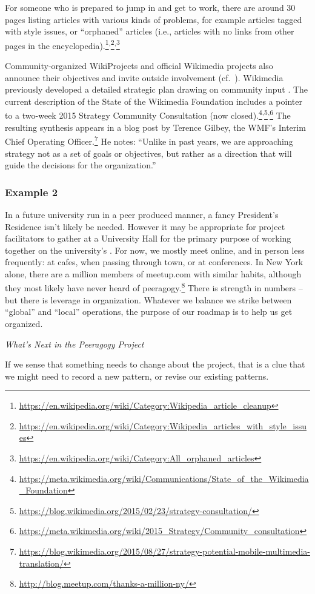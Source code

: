 For someone who is prepared to jump in and get to work, there are
around 30 pages listing articles with various kinds of problems, for
example articles tagged with style issues, or ``orphaned'' articles
(i.e., articles with no links from other pages in the
encyclopedia).\footnote{\url{https://en.wikipedia.org/wiki/Category:Wikipedia_article_cleanup}}\textsuperscript{,}\footnote{\url{https://en.wikipedia.org/wiki/Category:Wikipedia_articles_with_style_issues}}\textsuperscript{,}\footnote{\url{https://en.wikipedia.org/wiki/Category:All_orphaned_articles}}

Community-organized WikiProjects and official Wikimedia projects also announce their objectives  and invite outside involvement (cf.~).  Wikimedia previously developed
a detailed strategic plan drawing on community input
\cite{wikimedia2011plan}.  The current description of the State of
the Wikimedia Foundation includes a pointer to a two-week 2015
Strategy Community Consultation (now closed).\footnote{\url{https://meta.wikimedia.org/wiki/Communications/State_of_the_Wikimedia_Foundation}}\textsuperscript{,}\footnote{\url{https://blog.wikimedia.org/2015/02/23/strategy-consultation/}}\textsuperscript{,}\footnote{\url{https://meta.wikimedia.org/wiki/2015_Strategy/Community_consultation}}  The resulting synthesis appears in a blog post by Terence Gilbey, the WMF's Interim Chief Operating Officer.\footnote{\url{https://blog.wikimedia.org/2015/08/27/strategy-potential-mobile-multimedia-translation/}}  He notes: ``Unlike in past years, we are approaching strategy not as a set of goals or objectives, but rather as a direction that will guide the decisions for the organization.''

\subsubsection*{Example 2}
In a future university run in a peer produced manner, a fancy
President's Residence isn't likely be needed.  However it may be
appropriate for project facilitators to gather at a University Hall
for the primary purpose of working together on the university's
.  For now, we mostly meet online, and in person
less frequently: at cafes, when passing through town, or at
conferences.  In New York alone, there are a million members of
meetup.com with similar habits, although they most likely have never
heard of
peeragogy.\footnote{\url{http://blog.meetup.com/thanks-a-million-ny/}}
There is strength in numbers -- but there is leverage in organization.
Whatever we balance we strike between ``global'' and ``local''
operations, the purpose of our roadmap is to help us get organized.

\begin{framed}
\noindent
\emph{What's Next in the Peeragogy Project}
\begin{collectinmacro}{\RoadmapWN}{}{}
If we sense that something needs to change about the project, that is a clue that we might need to record a new pattern, or revise our existing patterns.
\end{collectinmacro}
\RoadmapWN
\end{framed}
